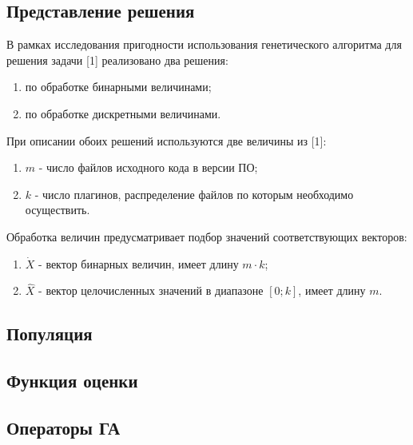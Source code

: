\subsection*{Представление решения}
В рамках исследования пригодности использования генетического алгоритма для решения задачи [1] реализовано два решения:
\begin{enumerate}
  \item по обработке бинарными величинами;
  \item по обработке дискретными величинами.
\end{enumerate}

При описании обоих решений используются две величины из [1]:
\begin{enumerate}
  \item $m$ - число файлов исходного кода в версии ПО;
  \item $k$ - число плагинов, распределение файлов по которым необходимо осуществить.
\end{enumerate}

Обработка величин предусматривает подбор значений соответствующих векторов:
\begin{enumerate}
  \item $\dot{X}$ - вектор бинарных величин, имеет длину $m \cdot k$;
  \item $\hat{X}$ - вектор целочисленных значений в диапазоне $[0; k]$, имеет длину $m$.
\end{enumerate}



\subsection*{Популяция}

\subsection*{Функция оценки}

\subsection*{Операторы ГА}

